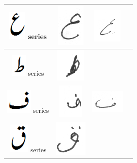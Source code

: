\begin{table}[h]
\begin{tabular}{@{}cccc@{}}
\hline
\includegraphics[scale=0.15]{aien_orig} series & 
\includegraphics[scale=0.15]{131} & \includegraphics[scale=0.15]{132}  &  \\
\hline
\includegraphics[scale=0.15]{tuay_orig} series & \includegraphics[scale=0.15]{133} &  &  \\
\hline
\includegraphics[scale=0.25]{fay_orig} series & \includegraphics[scale=0.25]{134} & \includegraphics[scale=0.25]{135}  &  \\
\hline
\includegraphics[scale=0.20]{qaaf_orig} series & \includegraphics[scale=0.15]{136} & & \\

\end{tabular}
\end{table}

